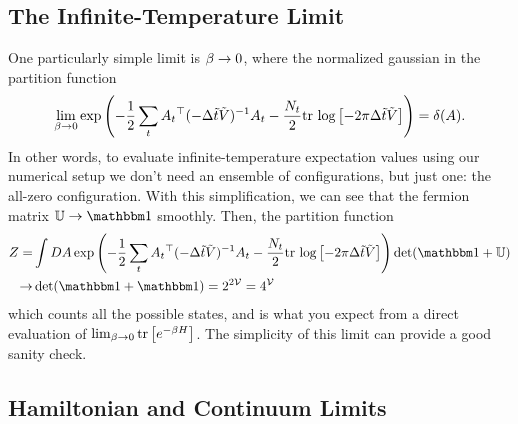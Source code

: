 \subsection{The Infinite-Temperature Limit}\label{sec:infinite temperature}

One particularly simple limit is $\beta\rightarrow0$, where the normalized gaussian in the partition function
\begin{align}
	\lim_{\beta\rightarrow0} \exp\left(-\frac{1}{2} \sum_t A_t{}^{\top} (-\Delta\tilde{t}\tilde{V})^{-1} A_t - \frac{N_t}{2} \text{tr log}\left[ -2\pi \Delta\tilde{t}\tilde{V} \right]\right)
	=
	\delta( A ).
\end{align}
In other words, to evaluate infinite-temperature expectation values using our numerical setup we don't need an ensemble of configurations, but just one: the all-zero configuration.
With this simplification, we can see that the fermion matrix $\UU \goesto \one$ smoothly.
Then, the partition function
\begin{align}
	Z
	=&
	\int DA \exp\left(-\half \sum_t A_t\transpose (-\Delta\tilde{t}\tilde{V})\inverse A_t - \frac{N_t}{2} \trlog{ -2\pi \Delta\tilde{t}\tilde{V} }\right) \det(\one+\UU)
	\nonumber\\
	\goesto&
	\det(\one+\one) = 2^{2\Volume} = 4^\Volume
\end{align}
which counts all the possible states, and is what you expect from a direct evaluation of $\lim_{\beta\rightarrow0}\text{tr}\left[e^{-\beta H}\right]$.
The simplicity of this limit can provide a good sanity check.

\subsection{Hamiltonian and Continuum Limits}\label{sec:continuum limit}

